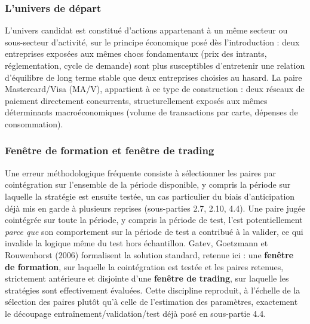 \documentclass{article}
\begin{document}
\subsubsection*{L'univers de départ}
L'univers candidat est constitué d'actions appartenant à un même secteur ou sous-secteur d'activité, sur le principe économique posé dès l'introduction : deux entreprises exposées aux mêmes chocs fondamentaux (prix des intrants, réglementation, cycle de demande) sont plus susceptibles d'entretenir une relation d'équilibre de long terme stable que deux entreprises choisies au hasard. La paire Mastercard/Visa (MA/V), appartient à ce type de construction : deux réseaux de paiement directement concurrents, structurellement exposés aux mêmes déterminants macroéconomiques (volume de transactions par carte, dépenses de consommation).
\subsubsection*{Fenêtre de formation et fenêtre de trading}
Une erreur méthodologique fréquente consiste à sélectionner les paires par cointégration sur l'ensemble de la période disponible, y compris la période sur laquelle la stratégie est ensuite testée, un cas particulier du biais d'anticipation déjà mis en garde à plusieurs reprises (sous-parties 2.7, 2.10, 4.4). Une paire jugée cointégrée sur toute la période, y compris la période de test, l'est potentiellement \emph{parce que} son comportement sur la période de test a contribué à la valider, ce qui invalide la logique même du test hors échantillon.
Gatev, Goetzmann et Rouwenhorst (2006) formalisent la solution standard, retenue ici : une \textbf{fenêtre de formation}, sur laquelle la cointégration est testée et les paires retenues, strictement antérieure et disjointe d'une \textbf{fenêtre de trading}, sur laquelle les stratégies sont effectivement évaluées. Cette discipline reproduit, à l'échelle de la sélection des paires plutôt qu'à celle de l'estimation des paramètres, exactement le découpage entraînement/validation/test déjà posé en sous-partie 4.4.
\end{document}
